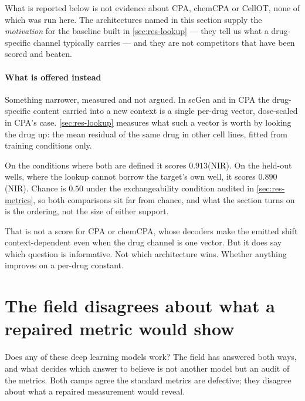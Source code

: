 \begin{scopelimit}
What is reported below is not evidence about CPA, chemCPA or CellOT, none of
which was run here. The architectures named in this section supply the
\emph{motivation} for the baseline built in \cref{sec:res-lookup} --- they tell
us what a drug-specific channel typically carries --- and they are not
competitors that have been scored and beaten.
\end{scopelimit}

\paragraph{What is offered instead} Something narrower, measured and not argued.
In scGen and in CPA the drug-specific content carried into a new context is a
single per-drug vector, dose-scaled in CPA's case. \cref{sec:res-lookup}
measures what such a vector is worth by looking the drug up: the mean residual of
the same drug in other cell lines, fitted from training conditions
only.

On the conditions where both are defined it scores $0.913$(NIR). On the held-out wells, where the lookup cannot
borrow the target's own well, it scores $0.890$(NIR). Chance is $0.50$ under the
exchangeability condition audited in \cref{sec:res-metrics}, so both comparisons
sit far from chance, and what the section turns
on is the ordering, not the size of either support.

That is not a score for CPA or chemCPA, whose decoders make the emitted shift
context-dependent even when the drug channel is one vector. But it does say which
question is informative. Not which architecture wins. Whether anything improves
on a per-drug constant.


\section{The field disagrees about what a repaired metric would show}
\label{sec:lit-dispute}
\framedecl{-}

\begin{question}
Does any of these deep learning models work? The field has answered both ways, and what decides which
answer to believe is not another model but an audit of the metrics. Both camps
agree the standard metrics are defective; they disagree about what a repaired
measurement would reveal.
\end{question}

